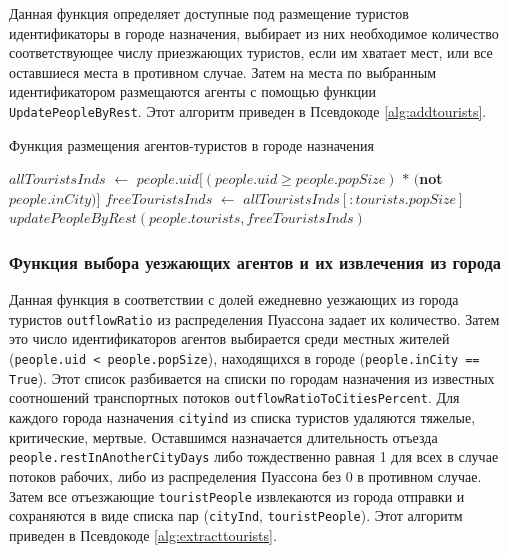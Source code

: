 \documentclass[a4paper,12pt]{article} %
\begin{document}
Данная функция определяет доступные под размещение туристов идентификаторы в городе назначения, выбирает из них необходимое количество соответствующее числу приезжающих туристов, если им хватает мест, или все оставшиеся места в противном случае. Затем на места по выбранным идентификатором размещаются агенты с помощью функции \texttt{UpdatePeopleByRest}. Этот алгоритм приведен в Псевдокоде \ref{alg:addtourists}.

\begin{algorithm}[H]
\caption{Функция размещения агентов-туристов в городе назначения}
\label{alg:addtourists}
\begin{algorithmic}[1]
	\State \(allTouristsInds\) \(\gets\) \(people.uid[(people.uid \geqslant people.popSize)\) \(*\) \((\)\textbf{not} \(people.inCity)]\)
	\State \(freeTouristsInds\) \(\gets\) \(allTouristsInds[:tourists.popSize]\)
	\State \(updatePeopleByRest(people.tourists,freeTouristsInds)\)
\EndFunction
\end{algorithmic}
\end{algorithm}

\subsubsection{Функция выбора уезжающих агентов и их извлечения из города}
Данная функция в соответствии с долей ежедневно уезжающих из города туристов \texttt{outflowRatio} из распределения Пуассона задает их количество. Затем это число идентификаторов агентов выбирается среди местных жителей (\texttt{people.uid < people.popSize}), находящихся в городе (\texttt{people.inCity == True}). Этот список разбивается на списки по городам назначения из известных соотношений транспортных потоков \texttt{outflowRatioToCitiesPercent}. Для каждого города назначения \texttt{cityind} из списка туристов удаляются тяжелые, критические, мертвые. Оставшимся назначается длительность отъезда \texttt{people.restInAnotherCityDays} либо тождественно равная 1 для всех в случае потоков рабочих, либо из распределения Пуассона без 0 в противном случае. Затем все отъезжающие \texttt{touristPeople} извлекаются из города отправки и сохраняются в виде списка пар (\texttt{cityInd}, \texttt{touristPeople}). Этот алгоритм приведен в Псевдокоде \ref{alg:extracttourists}.
\end{document}

